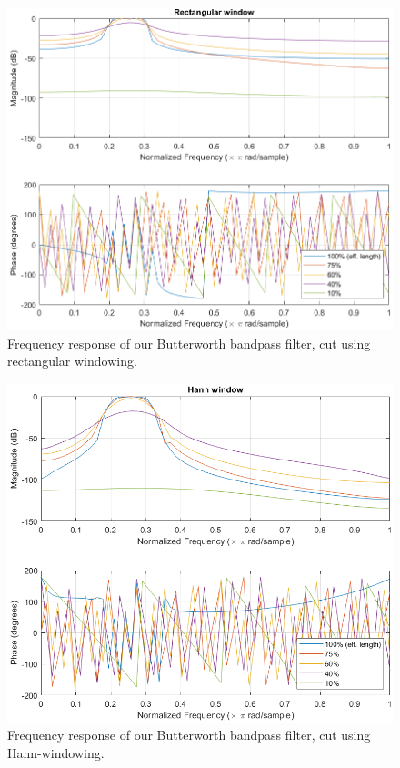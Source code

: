 \documentclass[journal]{IEEEtran}
\begin{document}
\begin{figure} [H]
    \centering
    \includegraphics[width=\linewidth]{assignment_02/plots/1.1_BW_FreqRes_RectWin.png}
    \caption{Frequency response of our Butterworth bandpass filter, cut using rectangular windowing.}
    \label{fig:rectwindfr}
\end{figure}

\begin{figure} [H]
    \centering
    \includegraphics[width=\linewidth]{assignment_02/plots/1.1_BW_FreqRes_HannWin.png}
    \caption{Frequency response of our Butterworth bandpass filter, cut using Hann-windowing.}
    \label{fig:hannwindfr}
\end{figure}
\end{document}
